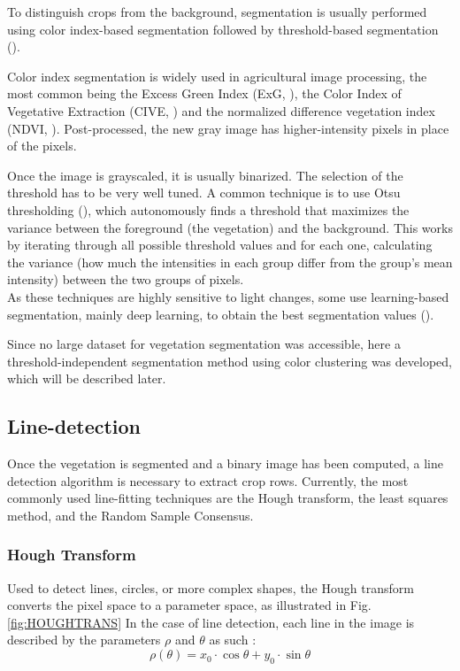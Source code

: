 To distinguish crops from the background, segmentation is usually performed using color index-based segmentation followed by threshold-based segmentation (\cite{VEGEIDX}). 

Color index segmentation is widely used in agricultural image processing, the most common being the Excess Green Index (ExG, \cite{ExgreenIdx}), the Color Index of Vegetative Extraction (CIVE, \cite{CIVE}) and the normalized difference vegetation index (NDVI, \cite{NDVI}). Post-processed, the new gray image has higher-intensity pixels in place of the pixels.

Once the image is grayscaled, it is usually binarized. The selection of the threshold has to be very well tuned. 
A common technique is to use Otsu thresholding (\citet{4310076}), which autonomously finds a threshold that maximizes the variance between the foreground (the vegetation) and the background. This works by iterating through all possible threshold values and for each one, calculating the variance (how much the intensities in each group differ from the group's mean intensity) between the two groups of pixels. \\

As these techniques are highly sensitive to light changes, some use learning-based segmentation, mainly deep learning, to obtain the best segmentation values (\citet{deepLforSeg}). 

Since no large dataset for vegetation segmentation was accessible, here a threshold-independent segmentation method using color clustering was developed, which will be described later.

\subsection{Line-detection}

Once the vegetation is segmented and a binary image has been computed, a line detection algorithm is necessary to extract crop rows. Currently, the most commonly used line-fitting techniques are the Hough transform, the least squares method, and the Random Sample Consensus. 

\subsubsection{Hough Transform}
\label{subsubsection:HT}

Used to detect lines, circles, or more complex shapes, the Hough transform converts the pixel space to a parameter space, as illustrated in Fig. \ref{fig:HOUGHTRANS}
In the case of line detection, each line in the image is described by the parameters $\rho$  and $\theta$ as such : 
\begin{equation}
\rho(\theta) = x_{0} \cdot \cos{\theta} + y_{0} \cdot \sin{\theta} 
\end{equation}




